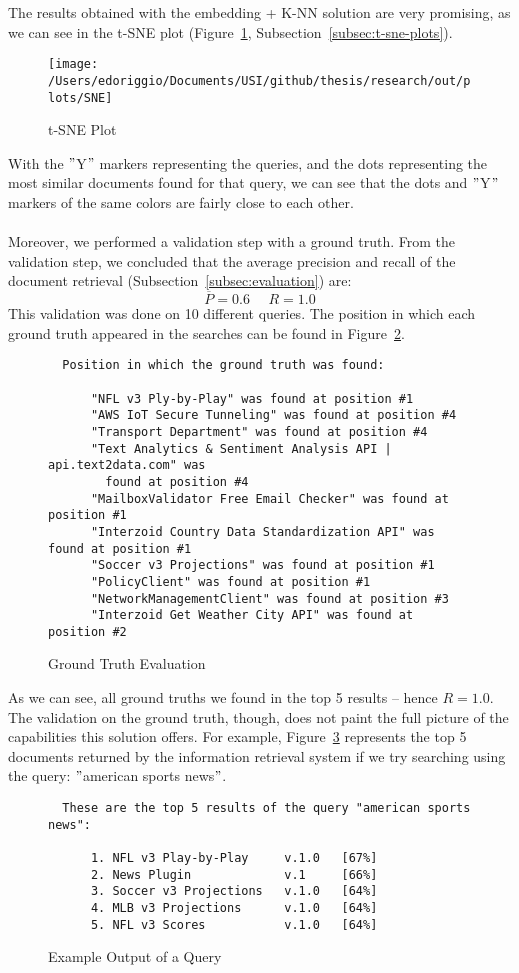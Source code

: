 The results obtained with the embedding + K-NN solution are very promising, as we can see in the t-SNE plot (Figure~\ref{fig:tSNE-plot}, Subsection~\ref{subsec:t-sne-plots}).
\begin{figure}
    \centering
    \texttt{[image: /Users/edoriggio/Documents/USI/github/thesis/research/out/plots/SNE]}
    \caption{t-SNE Plot}
    \label{fig:tSNE-plot}
\end{figure}
With the \("\)Y\("\) markers representing the queries, and the dots representing the most similar documents found for that query, we can see that the dots and \("\)Y\("\) markers of the same colors are fairly close to each other. \\ \\
Moreover, we performed a validation step with a ground truth.
From the validation step, we concluded that the average precision and recall of the document retrieval (Subsection~\ref{subsec:evaluation}) are:
\[\overline{P} = 0.6 ~~~~~~ R = 1.0\]
This validation was done on 10 different queries.
The position in which each ground truth appeared in the searches can be found in Figure~\ref{fig:ground-truth-eval}.
\begin{figure}
    \begin{verbatim}
  Position in which the ground truth was found:

      "NFL v3 Ply-by-Play" was found at position #1
      "AWS IoT Secure Tunneling" was found at position #4
      "Transport Department" was found at position #4
      "Text Analytics & Sentiment Analysis API | api.text2data.com" was
        found at position #4
      "MailboxValidator Free Email Checker" was found at position #1
      "Interzoid Country Data Standardization API" was found at position #1
      "Soccer v3 Projections" was found at position #1
      "PolicyClient" was found at position #1
      "NetworkManagementClient" was found at position #3
      "Interzoid Get Weather City API" was found at position #2
    \end{verbatim}
    \caption{Ground Truth Evaluation}
    \label{fig:ground-truth-eval}
\end{figure}
As we can see, all ground truths we found in the top 5 results -- hence $R = 1.0$.
The validation on the ground truth, though, does not paint the full picture of the capabilities this solution offers.
For example, Figure~\ref{fig:query-example} represents the top 5 documents returned by the information retrieval system if we try searching using the query: \("\)american sports news\("\).
\begin{figure}
    \begin{verbatim}
  These are the top 5 results of the query "american sports news":

      1. NFL v3 Play-by-Play     v.1.0   [67%]
      2. News Plugin             v.1     [66%]
      3. Soccer v3 Projections   v.1.0   [64%]
      4. MLB v3 Projections      v.1.0   [64%]
      5. NFL v3 Scores           v.1.0   [64%]
    \end{verbatim}
    \caption{Example Output of a Query}
    \label{fig:query-example}
\end{figure}
